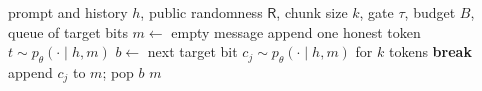 \begin{algorithm}[t]
\caption{Sender of the \etwo public bit channel (one message). All quantities except the target bits are public.}
\label{alg:sender}
\begin{algorithmic}[1]
\Require prompt and history $h$, public randomness $\mathsf{R}$, chunk size $k$, gate $\tau$, budget $B$, queue of target bits
\State $m \gets$ empty message
        \State append one honest token $t \sim p_\theta(\cdot \mid h, m)$ 
    \Else
        \State $b \gets$ next target bit 
            \State $c_j \sim p_\theta(\cdot \mid h, m)$ for $k$ tokens
             \textbf{break} \EndIf
        \EndFor
        \State append $c_j$ to $m$; pop $b$ 
    \EndIf
\EndWhile
\State \Return $m$
\end{algorithmic}
\end{algorithm}
